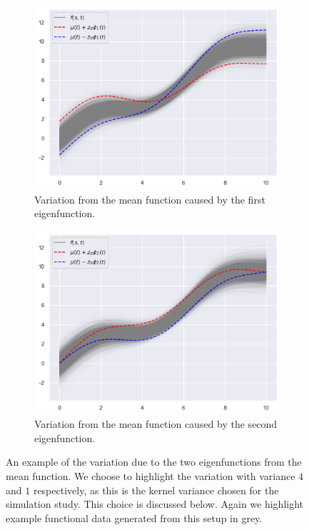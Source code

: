 \begin{figure}
	\centering
	\begin{subfigure}[b]{0.45\textwidth}
		\includegraphics[width=\textwidth]{sim_eig_1}
		\caption{Variation from the mean function caused by the first eigenfunction.}
		\label{fig:sim_eig1}
	\end{subfigure}
	\hfill        
	\begin{subfigure}[b]{0.45\textwidth}
		\includegraphics[width=\textwidth]{sim_eig_2}
		\caption{Variation from the mean function caused by the second eigenfunction.}
		\label{fig:sim_eig2}
	\end{subfigure}
	\caption{An example of the variation due to the two eigenfunctions from the mean function. We choose to highlight the variation with variance $4$ and $1$ respectively, as this is the kernel variance chosen for the simulation study. This choice is discussed below. Again we highlight example functional data generated from this setup in grey.}
	\label{fig:sim_eig}
\end{figure}

